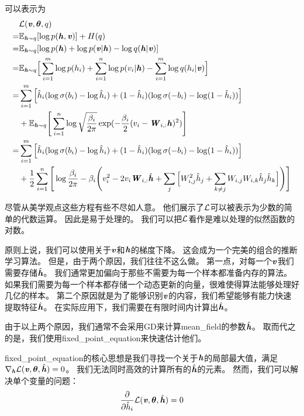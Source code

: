 可以表示为
\begin{align}
\label{eqn:1936}
& \mathcal{L}(\boldsymbol{\mathit{v}},\boldsymbol{\theta},q)\\
 = & \mathbb{E}_{\boldsymbol{\mathit{h}}\sim q}[\log p(\boldsymbol{\mathit{h}},\boldsymbol{\mathit{v}})] + H(q)\\
 = & \mathbb{E}_{\boldsymbol{\mathit{h}}\sim q}[\log p(\boldsymbol{\mathit{h}}) + \log p(\boldsymbol{\mathit{v}}\vert\boldsymbol{\mathit{h}}) - \log q(\boldsymbol{\mathit{h}}\vert\boldsymbol{\mathit{v}})]\\
= & \mathbb{E}_{\boldsymbol{\mathit{h}}\sim q}\Big[\sum_{i=1}^{m}\log p(h_i) + \sum_{i=1}^{n} \log p(v_i\vert\boldsymbol{\mathit{h}}) - \sum_{i=1}^{m}\log q(h_i\vert\boldsymbol{\mathit{v}})\Big]\\
= &  \sum_{i=1}^{m}\Big[\hat{h}_i(\log \sigma(b_i) - \log \hat{h}_i) + (1 - \hat{h}_i)(\log \sigma(-b_i) - \log (1-\hat{h}_i))\Big] \\
& +  \mathbb{E}_{\boldsymbol{\mathit{h}}\sim q} \Bigg[ \sum_{i=1}^{n}\log \sqrt{\frac{\beta_i}{2\pi}}\exp(-\frac{\beta_i}{2}(v_i - \boldsymbol{\mathit{W}}_{i,:}\boldsymbol{\mathit{h}})^2)\Bigg] \\
= &  \sum_{i=1}^{m}\Big[\hat{h}_i(\log \sigma(b_i) - \log \hat{h}_i) + (1 - \hat{h}_i)(\log \sigma(-b_i) - \log (1-\hat{h}_i))\Big] \\
& + \frac{1}{2} \sum_{i=1}^{n} \Bigg[ \log {\frac{\beta_i}{2\pi}} - \beta_i \Bigg(v_i^2 - 2 v_i \boldsymbol{\mathit{W}}_{i,:}\hat{\boldsymbol{\mathit{h}}} + \sum_{j}\Big[W^2_{i,j}\hat{h}_j + \sum_{k \neq j}W_{i,j}W_{i,k}\hat{h}_j\hat{h}_k \Big] \Bigg) \Bigg] 
\end{align}


尽管从美学观点这些方程有些不尽如人意。
他们展示了$\mathcal{L}$可以被表示为少数的简单的代数运算。
因此是易于处理的。
我们可以把$\mathcal{L}$看作是难以处理的似然函数的对数。


原则上说，我们可以使用关于$\boldsymbol{\mathit{v}}$和$\boldsymbol{\mathit{h}}$的梯度下降。
这会成为一个完美的组合的推断学习算法。
但是，由于两个原因，我们往往不这么做。
第一点，对每一个$\boldsymbol{\mathit{v}}$我们需要存储$\hat{\boldsymbol{\mathit{h}}}$。
我们通常更加偏向于那些不需要为每一个样本都准备内存的算法。
如果我们需要为每一个样本都存储一个动态更新的向量，很难使得算法能够处理好几亿的样本。
第二个原因就是为了能够识别$\boldsymbol{\mathit{v}}$的内容，我们希望能够有能力快速提取特征$\hat{\boldsymbol{\mathit{h}}}$。
在实际应用下，我们需要在有限时间内计算出$\hat{\boldsymbol{\mathit{h}}}$。


由于以上两个原因，我们通常不会采用\gls{GD}来计算\gls{mean_field}的参数$\hat{\boldsymbol{\mathit{h}}}$。
取而代之的是，我们使用\gls{fixed_point_equation}来快速估计他们。


\gls{fixed_point_equation}的核心思想是我们寻找一个关于$\boldsymbol{\mathit{h}}$的局部最大值，满足$\nabla_{\boldsymbol{\mathit{h}}}\mathcal{L}(\boldsymbol{\mathit{v}},\boldsymbol{\theta},\hat{\boldsymbol{\mathit{h}}}) = 0$。
我们无法同时高效的计算所有的$\hat{\boldsymbol{\mathit{h}}}$的元素。
然而，我们可以解决单个变量的问题：
\begin{align}
\label{eqn:1937}
\frac{\partial}{\partial \hat{h}_i} \mathcal{L}(\boldsymbol{\mathit{v}},\boldsymbol{\theta},\hat{\boldsymbol{\mathit{h}}}) = 0 
\end{align}



